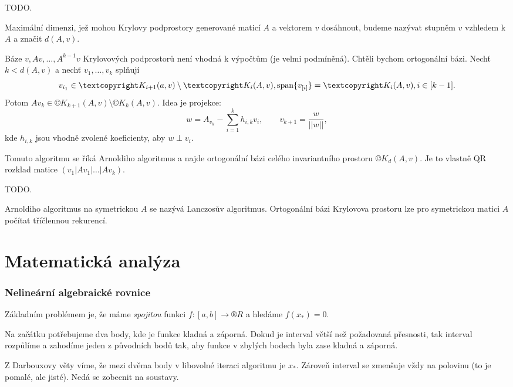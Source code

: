 \documentclass[12pt]{article}					%
\begin{document}

TODO.

\begin{definice}
	Maximální dimenzi, jež mohou Krylovy podprostory generované maticí $A$ a vektorem $v$ dosáhnout, budeme nazývat stupněm $v$ vzhledem k $A$ a značit $d(A, v)$.
\end{definice}

\begin{definice}
	Báze $v, Av, …, A^{k-1}v$ Krylovových podprostorů není vhodná k výpočtům (je velmi podmíněná). Chtěli bychom ortogonální bázi. Nechť $k < d(A, v)$ a nechť $v_1, …, v_k$ splňují
	$$ v_{i_1} \in ©K_{i+1}(a, v) \setminus ©K_i(A, v), \spn \{v_{[i]}\} = ©K_i(A, v), i \in [k-1]. $$
	Potom $A v_k \in ©K_{k+1}(A, v) \setminus ©K_k(A, v)$. Idea je projekce:
	$$ w = A_{v_k} - \sum_{i=1}^k h_{i, k}v_i, \qquad v_{k+1} = \frac{w}{||w||}, $$
	kde $h_{i, k}$ jsou vhodně zvolené koeficienty, aby $w \perp v_i$.

	Tomuto algoritmu se říká Arnoldiho algoritmus a najde ortogonální bázi celého invariantního prostoru $©K_d(A, v)$. Je to vlastně QR rozklad matice $(v_1|Av_1|…|Av_k)$.
\end{definice}

\begin{definice}
	TODO.
\end{definice}

\begin{definice}
	Arnoldiho algoritmus na symetrickou $A$ se nazývá Lanczosův algoritmus. Ortogonální bázi Krylovova prostoru lze pro symetrickou matici $A$ počítat tříčlennou rekurencí.
\end{definice}


\part{Matematická analýza}
\section{Nelineární algebraické rovnice}
\begin{definice}
	Základním problémem je, že máme \emph{spojitou} funkci $f: [a, b] \rightarrow ®R$ a hledáme $f(x_*) = 0$.
\end{definice}

\begin{definice}
	Na začátku potřebujeme dva body, kde je funkce kladná a záporná. Dokud je interval větší než požadovaná přesnosti, tak interval rozpůlíme a zahodíme jeden z původních bodů tak, aby funkce v zbylých bodech byla zase kladná a záporná.

	Z Darbouxovy věty víme, že mezi dvěma body v libovolné iteraci algoritmu je $x_*$. Zároveň interval se zmenšuje vždy na polovinu (to je pomalé, ale jisté). Nedá se zobecnit na soustavy.
\end{definice}
\end{document}
